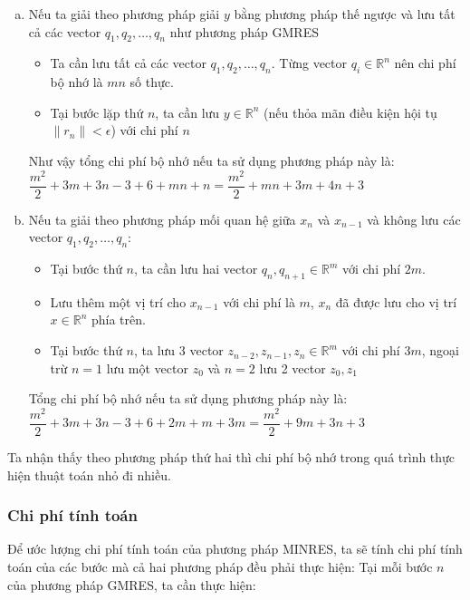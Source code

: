 \documentclass[14pt, a4paper]{article}
\numberwithin{equation}{section}
\numberwithin{algorithm}{section}
\numberwithin{figure}{section}
\numberwithin{dl}{section}
\numberwithin{md}{section}
\numberwithin{bd}{section}
\numberwithin{dn}{section}
\numberwithin{hq}{section}
\begin{document}
\begin{enumerate}[a)] %
    \item Nếu ta giải theo phương pháp giải $y$ bằng phương pháp thế ngược và lưu tất cả các vector $q_1, q_2, \dots, q_n$ như phương pháp GMRES
    \begin{itemize}
        \item Ta cần lưu tất cả các vector $q_1, q_2, \dots, q_n$. Từng vector $q_i \in \mathbb{R}^n$ nên chi phí bộ nhớ là $mn$ số thực.
        \item Tại bước lặp thứ $n$, ta cần lưu $y \in \mathbb{R}^n$ (nếu thỏa mãn điều kiện hội tụ $\lVert r_n \rVert < \epsilon$) với chi phí $n$
    \end{itemize}
    Như vậy tổng chi phí bộ nhớ nếu ta sử dụng phương pháp này là: $\dfrac{m^2}{2}+3m + 3n-3+6+mn+n=\dfrac{m^2}{2}+mn+3m+4n+3$
    \item Nếu ta giải theo phương pháp mối quan hệ giữa $x_n$ và $x_{n-1}$ và không lưu các vector $q_1, q_2, \dots, q_n$:
    \begin{itemize}
        \item Tại bước thứ $n$, ta cần lưu hai vector $q_{n}, q_{n+1} \in \mathbb{R}^m$ với chi phí $2m$.
        \item Lưu thêm một vị trí cho $x_{n-1}$ với chi phí là $m$, $x_n$ đã được lưu cho vị trí $x \in \mathbb{R}^n$ phía trên.
        \item Tại bước thứ $n$, ta lưu 3 vector $z_{n-2}, z_{n-1}, z_n \in \mathbb{R}^m$ với chi phí $3m$, ngoại trừ $n=1$ lưu một vector $z_0$ và $n=2$ lưu 2 vector $z_0, z_1$
    \end{itemize}
    Tổng chi phí bộ nhớ nếu ta sử dụng phương pháp này là: $\dfrac{m^2}{2}+3m + 3n-3+6+2m + m + 3m=\dfrac{m^2}{2}+9m+3n+3$
\end{enumerate}

Ta nhận thấy theo phương pháp thứ hai thì chi phí bộ nhớ trong quá trình thực hiện thuật toán nhỏ đi nhiều.

\subsubsection{Chi phí tính toán} \label{MINRES-Computation-Cost}

Để ước lượng chi phí tính toán của phương pháp MINRES, ta sẽ tính chi phí tính toán của các bước mà cả hai phương pháp đều phải thực hiện:
Tại mỗi bước $n$ của phương pháp GMRES, ta cần thực hiện:
\end{document}
